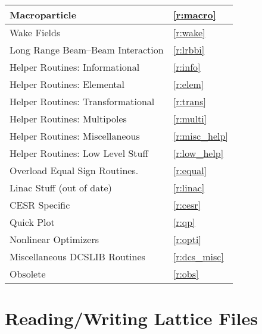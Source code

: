\begin{center}
\begin{tabular}{|l|l|}
  Macroparticle                           & \ref{r:macro}      \\ \hline
  Wake Fields                             & \ref{r:wake}       \\ \hline
 	Long Range Beam--Beam Interaction       & \ref{r:lrbbi}      \\ \hline
 	Helper Routines: Informational          & \ref{r:info}       \\ \hline
 	Helper Routines: Elemental              & \ref{r:elem}       \\ \hline
 	Helper Routines: Transformational       & \ref{r:trans}      \\ \hline
 	Helper Routines: Multipoles             & \ref{r:multi}      \\ \hline
 	Helper Routines: Miscellaneous          & \ref{r:misc_help}  \\ \hline
 	Helper Routines: Low Level Stuff        & \ref{r:low_help}   \\ \hline
 	Overload Equal Sign Routines.           & \ref{r:equal}      \\ \hline
 	Linac Stuff (out of date)               & \ref{r:linac}      \\ \hline
 	CESR Specific                           & \ref{r:cesr}       \\ \hline
  Quick Plot                              & \ref{r:qp}         \\ \hline
  Nonlinear Optimizers                    & \ref{r:opti}       \\ \hline
  Miscellaneous DCSLIB Routines           & \ref{r:dcs_misc}   \\ \hline
 	Obsolete                                & \ref{r:obs}        \\ \hline
 	\end{tabular}
\end{center}
\toffset

\section{Reading/Writing Lattice Files} 
\label{r:read}


